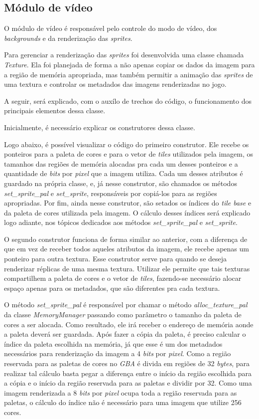 \subsection{Módulo de vídeo}

O módulo de vídeo é responsável pelo controle do modo de vídeo, dos \textit{backgrounds} e da renderização das \textit{sprites}.

Para gerenciar a renderização das \textit{sprites} foi desenvolvida uma classe chamada \textit{Texture}. Ela foi planejada de forma a não apenas copiar os dados da imagem para a região de memória apropriada, mas também permitir a animação das \textit{sprites} de uma textura e controlar os metadados das imagens renderizadas no jogo.

A seguir, será explicado, com o auxílo de trechos do código, o funcionamento dos principais elementos dessa classe.

Inicialmente, é necessário explicar os construtores dessa classe.

Logo abaixo, é possível visualizar o código do primeiro construtor. Ele recebe os ponteiros para a paleta de cores e para o vetor de \textit{tiles} utilizados pela imagem, os tamanhos das regiões de memória alocadas pra cada um desses ponteiros e a quantidade de \textit{bits} por \textit{pixel} que a imagem utiliza. Cada um desses atributos é guardado na própria classe, e, já nesse construtor, são chamados os métodos \textit{set\_sprite\_pal} e \textit{set\_sprite}, responsáveis por copiá-los para as regiões apropriadas. Por fim, ainda nesse construtor, são setados os índices do \textit{tile base} e da paleta de cores utilizada pela imagem. O cálculo desses índices será explicado logo adiante, nos tópicos dedicados aos métodos \textit{set\_sprite\_pal} e \textit{set\_sprite}.

O segundo construtor funciona de forma similar ao anterior, com a diferença de que em vez de receber todos aqueles atributos da imagem, ele recebe apenas um ponteiro para outra textura. Esse construtor serve para quando se deseja renderizar réplicas de uma mesma textura. Utilizar ele permite que tais texturas compartilhem a paleta de cores e o vetor de \textit{tiles}, fazendo-se necessário alocar espaço apenas para os metadados, que são diferentes pra cada textura.

O método \textit{set\_sprite\_pal} é responsável por chamar o método \textit{alloc\_texture\_pal} da classe \textit{MemoryManager} passando como parâmetro o tamanho da paleta de cores a ser alocada. Como resultado, ele irá receber o endereço de memória aonde a paleta deverá ser guardada. Após fazer a cópia da paleta, é preciso calcular o índice da paleta escolhida na memória, já que esse é um dos metadados necessários para renderização da imagem a 4 \textit{bits} por \textit{pixel}. Como a região reservada para as paletas de cores no \textit{GBA} é divida em regiões de 32 \textit{bytes}, para realizar tal cálculo basta pegar a diferença entre o início da região escolhida para a cópia e o início da região reservada para as paletas e dividir por 32.
Como uma imagem renderizada a 8 \textit{bits} por \textit{pixel} ocupa toda a região reservada para as paletas, o cálculo do índice não é necessário para uma imagem que utilize 256 cores.

